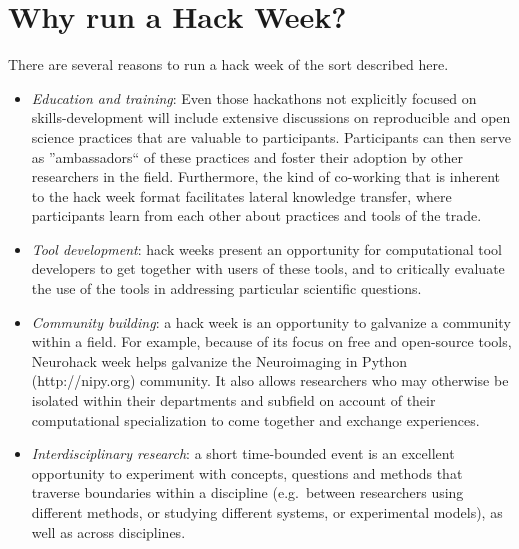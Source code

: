\section*{Why run a Hack Week?}

There are several reasons to run a hack week of the sort described here.

\begin{itemize}
\item{\textit{Education and training}: %
Even those hackathons not explicitly focused on skills-development will include extensive discussions on reproducible and open science practices that are valuable to participants.
Participants can then serve as ''ambassadors`` of these practices and foster their adoption by other researchers in the field.
Furthermore, the kind of co-working that is inherent to the hack week format facilitates lateral knowledge transfer, where participants learn from each other about practices and tools of the trade.}
\item{\textit{Tool development}: hack weeks present an opportunity for computational tool developers to get together with users of these tools, and to critically evaluate the use of the tools in addressing particular scientific questions.}
\item{\textit{Community building}: a hack week is an opportunity to galvanize a community within a field.%
For example, because of its focus on free and open-source tools, Neurohack week helps galvanize the Neuroimaging in Python (http://nipy.org) community.
It also allows researchers who may otherwise be isolated within their departments and subfield on account of their computational specialization to come together and exchange experiences.}
\item{\textit{Interdisciplinary research}: a short time-bounded event is an excellent opportunity to experiment with concepts, questions and methods that traverse boundaries within a discipline (e.g.\ between researchers using different methods, or studying different systems, or experimental models), as well as across disciplines.
}
\end{itemize}
